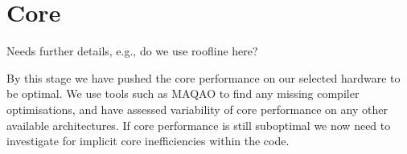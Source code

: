 \chapter{Core}
\label{chapter:core analysis}

\begin{wip}
  Needs further details, e.g., do we use roofline here?
\end{wip}

By this stage we have pushed the core performance on our selected hardware to
be optimal. We use tools such as MAQAO to find any missing compiler
optimisations, and have assessed variability of core performance on any other
available architectures. If core performance is still suboptimal we now need to
investigate for implicit core inefficiencies within the code.

% 
% 
% 
% 
